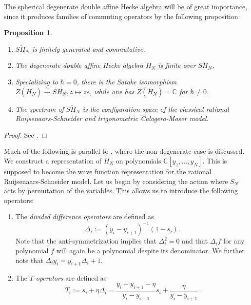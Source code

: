 \documentclass[11pt]{report}
\newtheorem{prop}[theorem]{Proposition}
\theoremstyle{definition}
\theoremstyle{remark}
\theoremstyle{remark}
\newcommand{\C}{\mathbb{C}}
\begin{document}
The spherical degenerate double affine Hecke algebra will be of great importance, since it produces families of commuting operators by the following proposition: 

\begin{prop}
\begin{enumerate}[label=(\roman*)]
\item $S\ddot H_N$ is finitely generated and commutative.
\item The degenerate double affine Hecke algebra $\ddot H_N$ is finite over $S\ddot H_N$.
\item Specializing to $\hbar = 0$, there is the Satake isomorphism $Z(\ddot H_N) \overset \sim \to S\ddot H_N, z \mapsto ze$, while one has $Z(\ddot H_N) = \C$ for $\hbar \neq 0$.
\item The spectrum of $S\ddot H_N$ is the configuration space of the classical rational Ruijsenaars-Schneider and trigonometric Calogero-Moser model.
\end{enumerate}
\end{prop}

\begin{proof}
See \cite{article:oblomkov:2003}.
\end{proof}

Much of the following is parallel to \cite{article:lamers:2022}, where the non-degenerate case is discussed. We construct a representation of $\dot H_N$ on polynomials $\C[y_1,...,y_N]$. This is supposed to become the wave function representation for the rational Ruijsenaars-Schneider model. Let us begin by considering the action where $S_N$ acts by permutation of the variables. This allows us to introduce the following operators:
\begin{enumerate}[label=(\roman*)]
\item The \emph{divided difference operators} are defined as
\begin{equation*}
\Delta_i := (y_i-y_{i+1})^{-1} (1-s_i).
\end{equation*}
Note that the anti-symmetrization implies that $\Delta_i^2 = 0$ and that $\Delta_i f$ for any polynomial $f$ will again be a polynomial despite its denominator. We further note that $\Delta_i y_i = y_{i+1} \Delta_i + 1$.
\item The \emph{$T$-operators} are defined as
\begin{equation*}
T_i := s_i + \eta \Delta_i = \frac{y_i-y_{i+1}-\eta}{y_i-y_{i+1}} s_i + \frac{\eta}{y_i-y_{i+1}}.
\end{equation*}
\end{enumerate}
\end{document}
